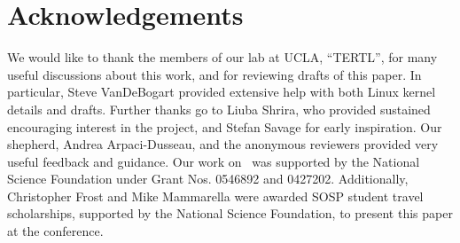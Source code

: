 \section*{Acknowledgements}

We would like to thank the members of our lab at UCLA, ``TERTL'', for many
useful discussions about this work, and for reviewing drafts of this paper. In
particular, Steve VanDeBogart provided extensive help with both Linux
kernel details and drafts. Further thanks go to Liuba
Shrira, who provided sustained encouraging interest in the project, and
Stefan Savage for early inspiration.
Our shepherd, Andrea Arpaci-Dusseau, and the anonymous reviewers
provided very useful feedback and guidance.
%
Our work on \Kudos\ was supported by the National Science
 Foundation under Grant Nos. 0546892 and 0427202.
%
Additionally, Christopher Frost and Mike Mammarella were awarded SOSP student
travel scholarships, supported by the National Science Foundation, to present
this paper at the conference.
